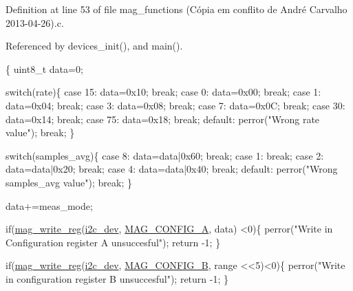 Definition at line 53 of file mag\-\_\-functions (\-Cópia em conflito de André Carvalho 2013-\/04-\/26).\-c.



Referenced by devices\-\_\-init(), and main().


\begin{DoxyCode}
\{ 
  uint8\_t data=0;

  \textcolor{keywordflow}{switch}(rate)\{
    \textcolor{keywordflow}{case} 15:
      data=0x10;
      \textcolor{keywordflow}{break};
    \textcolor{keywordflow}{case} 0:
      data=0x00;
      \textcolor{keywordflow}{break};
    \textcolor{keywordflow}{case} 1:
      data=0x04;
      \textcolor{keywordflow}{break};
    \textcolor{keywordflow}{case} 3:
      data=0x08;
      \textcolor{keywordflow}{break};
    \textcolor{keywordflow}{case} 7:
      data=0x0C;
      \textcolor{keywordflow}{break};
    \textcolor{keywordflow}{case} 30:
      data=0x14;
      \textcolor{keywordflow}{break};
    \textcolor{keywordflow}{case} 75:
      data=0x18;
      \textcolor{keywordflow}{break};
    \textcolor{keywordflow}{default}:
      perror(\textcolor{stringliteral}{"Wrong rate value"});
      \textcolor{keywordflow}{break};
  \}
  
  \textcolor{keywordflow}{switch}(samples\_avg)\{
    \textcolor{keywordflow}{case} 8:
      data=data|0x60;
      \textcolor{keywordflow}{break};
    \textcolor{keywordflow}{case} 1:
      \textcolor{keywordflow}{break};
    \textcolor{keywordflow}{case} 2:
      data=data|0x20;
      \textcolor{keywordflow}{break};
    \textcolor{keywordflow}{case} 4:
      data=data|0x40;
      \textcolor{keywordflow}{break};
    \textcolor{keywordflow}{default}:
      perror(\textcolor{stringliteral}{"Wrong samples\_avg value"});
      \textcolor{keywordflow}{break};
  \}
  
  data+=meas\_mode;
  
  \textcolor{keywordflow}{if}(\hyperlink{imu__functions_01_07C_xC3_xB3pia_01em_01conflito_01de_01Andr_xC3_xA9_01Carvalho_012013-04-26_08_8h_ab5d0ae421cd4bb10b1b7a1eda167416b}{mag\_write\_reg}(\hyperlink{CommunicationV0_2communication_8c_a7751bd45ac1064efb35adf1f19c25db8}{i2c\_dev}, \hyperlink{communication_2imu__regs_8h_a4c80cd6ce866f16a3d999ee2c5635ec9}{MAG\_CONFIG\_A}, data)
      <0)\{
    perror(\textcolor{stringliteral}{"Write in Configuration register A unsuccesful"});
    \textcolor{keywordflow}{return} -1;
  \}
  
  \textcolor{keywordflow}{if}(\hyperlink{imu__functions_01_07C_xC3_xB3pia_01em_01conflito_01de_01Andr_xC3_xA9_01Carvalho_012013-04-26_08_8h_ab5d0ae421cd4bb10b1b7a1eda167416b}{mag\_write\_reg}(\hyperlink{CommunicationV0_2communication_8c_a7751bd45ac1064efb35adf1f19c25db8}{i2c\_dev}, \hyperlink{communication_2imu__regs_8h_a094173f77219df894d97eed44405d942}{MAG\_CONFIG\_B}, range
      <<5)<0)\{
    perror(\textcolor{stringliteral}{"Write in configuration register B unsuccesful"});
    \textcolor{keywordflow}{return} -1;
  \}
  

\end{DoxyCode}
